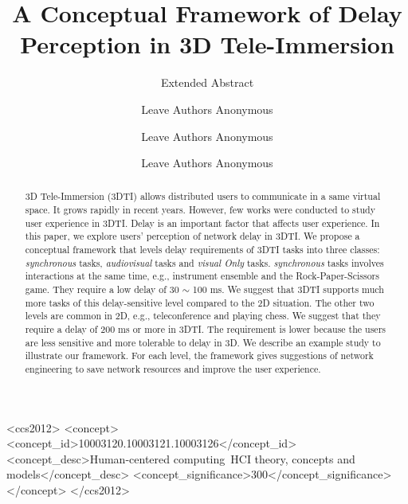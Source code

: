 \documentclass[sigchi, review]{acmart}
\begin{document}
\begin{CJK*}{UTF8}{gbsn}

\title{A Conceptual Framework of Delay Perception in 3D Tele-Immersion}

\subtitle{Extended Abstract}

\author{Leave Authors Anonymous}

\author{Leave Authors Anonymous}

\author{Leave Authors Anonymous}

\renewcommand{\shortauthors}{B. Trovato et al.}

\begin{abstract}

3D Tele-Immersion (3DTI) allows distributed users to communicate in a same virtual space. It grows rapidly in recent years. However, few works were conducted to study user experience in 3DTI. Delay is an important factor that affects user experience. In this paper, we explore users' perception of network delay in 3DTI. We propose a conceptual framework that levels delay requirements of 3DTI tasks into three classes: \emph{synchronous} tasks, \emph{audiovisual} tasks and \emph{visual Only} tasks. \emph{synchronous} tasks involves interactions at the same time, e.g., instrument ensemble and the Rock-Paper-Scissors game. They require a low delay of 30 $\sim$ 100 ms. We suggest that 3DTI supports much more tasks of this delay-sensitive level compared to the 2D situation. The other two levels are common in 2D, e.g., teleconference and playing chess. We suggest that they require a delay of 200 ms or more in 3DTI. The requirement is lower because the users are less sensitive and more tolerable to delay in 3D. We describe an example study to illustrate our framework. For each level, the framework gives suggestions of network engineering to save network resources and improve the user experience.

\end{abstract}

%
%
\begin{CCSXML}
<ccs2012>
<concept>
<concept_id>10003120.10003121.10003126</concept_id>
<concept_desc>Human-centered computing~HCI theory, concepts and models</concept_desc>
<concept_significance>300</concept_significance>
</concept>
</ccs2012>
\end{CCSXML}


\end{CJK*}
\end{document}
